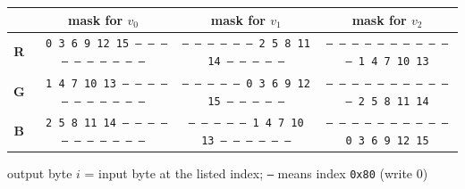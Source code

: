 \begin{tabular}{@{}cccc@{}}\toprule
 & mask for $v_0$ & mask for $v_1$ & mask for $v_2$\\ \midrule
\textbf{R} & \texttt{ 0  3  6  9 12 15 -- -- -- -- -- -- -- -- -- --} & \texttt{-- -- -- -- -- --  2  5  8 11 14 -- -- -- -- --} & \texttt{-- -- -- -- -- -- -- -- -- -- --  1  4  7 10 13} \\
\textbf{G} & \texttt{ 1  4  7 10 13 -- -- -- -- -- -- -- -- -- -- --} & \texttt{-- -- -- -- --  0  3  6  9 12 15 -- -- -- -- --} & \texttt{-- -- -- -- -- -- -- -- -- -- --  2  5  8 11 14} \\
\textbf{B} & \texttt{ 2  5  8 11 14 -- -- -- -- -- -- -- -- -- -- --} & \texttt{-- -- -- -- --  1  4  7 10 13 -- -- -- -- -- --} & \texttt{-- -- -- -- -- -- -- -- -- --  0  3  6  9 12 15} \\
\bottomrule\end{tabular}

{\footnotesize output byte $i$ = input byte at the listed index; \texttt{--} means index \texttt{0x80} (write 0)}